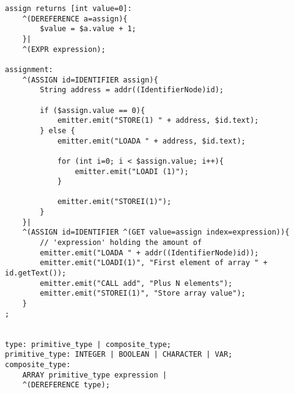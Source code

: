 \begin{landscape}
\begin{lstlisting}
assign returns [int value=0]:
    ^(DEREFERENCE a=assign){
        $value = $a.value + 1;
    }|
    ^(EXPR expression);

assignment:
    ^(ASSIGN id=IDENTIFIER assign){
        String address = addr((IdentifierNode)id);

        if ($assign.value == 0){
            emitter.emit("STORE(1) " + address, $id.text);
        } else {
            emitter.emit("LOADA " + address, $id.text);

            for (int i=0; i < $assign.value; i++){
                emitter.emit("LOADI (1)");
            }

            emitter.emit("STOREI(1)");
        }
    }|
    ^(ASSIGN id=IDENTIFIER ^(GET value=assign index=expression)){
        // 'expression' holding the amount of 
        emitter.emit("LOADA " + addr((IdentifierNode)id));
        emitter.emit("LOADI(1)", "First element of array " + id.getText());
        emitter.emit("CALL add", "Plus N elements");
        emitter.emit("STOREI(1)", "Store array value");
    }
;


type: primitive_type | composite_type;
primitive_type: INTEGER | BOOLEAN | CHARACTER | VAR;
composite_type:
    ARRAY primitive_type expression |
    ^(DEREFERENCE type);


\end{lstlisting}
\end{landscape}
